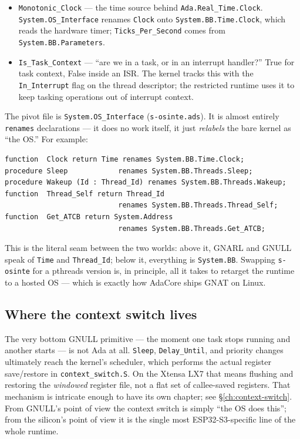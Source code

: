 \begin{itemize}
        caller's state to \texttt{Delay\_Sleep} and arms the kernel alarm queue
        in \texttt{System.BB.Time} for the absolute wake time. When the system
        timer fires at that time, the kernel makes the thread runnable.
  \item \texttt{Monotonic\_Clock} --- the time source behind \texttt{Ada.Real\_Time.Clock}.
        \texttt{System.OS\_Interface} renames \texttt{Clock} onto
        \texttt{System.BB.Time.Clock}, which reads the hardware timer;
        \texttt{Ticks\_Per\_Second} comes from \texttt{System.BB.Parameters}.
  \item \texttt{Is\_Task\_Context} --- ``are we in a task, or in an interrupt
        handler?'' True for task context, False inside an ISR. The kernel tracks
        this with the \texttt{In\_Interrupt} flag on the thread descriptor; the
        restricted runtime uses it to keep tasking operations out of interrupt
        context.
\end{itemize}

The pivot file is \texttt{System.OS\_Interface} (\texttt{s-osinte.ads}). It is
almost entirely \texttt{renames} declarations --- it does no work itself, it just
\emph{relabels} the bare kernel as ``the OS.'' For example:

\begin{lstlisting}
function  Clock return Time renames System.BB.Time.Clock;
procedure Sleep            renames System.BB.Threads.Sleep;
procedure Wakeup (Id : Thread_Id) renames System.BB.Threads.Wakeup;
function  Thread_Self return Thread_Id
                           renames System.BB.Threads.Thread_Self;
function  Get_ATCB return System.Address
                           renames System.BB.Threads.Get_ATCB;
\end{lstlisting}

This is the literal seam between the two worlds: above it, GNARL and GNULL speak
of \texttt{Time} and \texttt{Thread\_Id}; below it, everything is
\texttt{System.BB}. Swapping \texttt{s-osinte} for a pthreads version is, in
principle, all it takes to retarget the runtime to a hosted OS --- which is
exactly how AdaCore ships GNAT on Linux.

\subsection{Where the context switch lives}

The very bottom GNULL primitive --- the moment one task stops running and another
starts --- is not Ada at all. \texttt{Sleep}, \texttt{Delay\_Until}, and priority
changes ultimately reach the kernel's scheduler, which performs the actual
register save/restore in \texttt{context\_switch.S}. On the Xtensa LX7 that means
flushing and restoring the \emph{windowed} register file, not a flat set of
callee-saved registers. That mechanism is intricate enough to have its own
chapter; see \S\ref{ch:context-switch}. From GNULL's point of view the context
switch is simply ``the OS does this''; from the silicon's point of view it is the
single most ESP32-S3-specific line of the whole runtime.


